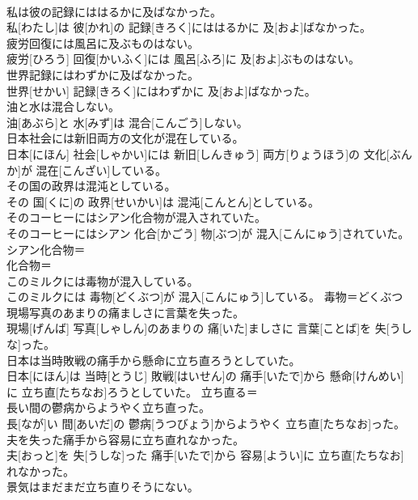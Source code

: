 \documentclass[8pt]{extreport}
\begin{document}
\begin{CJK}{UTF8}{min}
\\	私は彼の記録にははるかに及ばなかった。	
\\	私[わたし]は 彼[かれ]の 記録[きろく]にははるかに 及[およ]ばなかった。	
\\	疲労回復には風呂に及ぶものはない。	
\\	疲労[ひろう] 回復[かいふく]には 風呂[ふろ]に 及[およ]ぶものはない。	
\\	世界記録にはわずかに及ばなかった。	
\\	世界[せかい] 記録[きろく]にはわずかに 及[およ]ばなかった。	
\\	油と水は混合しない。	
\\	油[あぶら]と 水[みず]は 混合[こんごう]しない。	
\\	日本社会には新旧両方の文化が混在している。	
\\	日本[にほん] 社会[しゃかい]には 新旧[しんきゅう] 両方[りょうほう]の 文化[ぶんか]が 混在[こんざい]している。	
\\	その国の政界は混沌としている。	
\\	その 国[くに]の 政界[せいかい]は 混沌[こんとん]としている。	
\\	そのコーヒーにはシアン化合物が混入されていた。	
\\	そのコーヒーにはシアン 化合[かごう] 物[ぶつ]が 混入[こんにゅう]されていた。	シアン化合物＝ 
\\	{化合物＝ 
\\	このミルクには毒物が混入している。	
\\	このミルクには 毒物[どくぶつ]が 混入[こんにゅう]している。	毒物＝どくぶつ
\\	現場写真のあまりの痛ましさに言葉を失った。	
\\	現場[げんば] 写真[しゃしん]のあまりの 痛[いた]ましさに 言葉[ことば]を 失[うしな]った。	
\\	日本は当時敗戦の痛手から懸命に立ち直ろうとしていた。	
\\	日本[にほん]は 当時[とうじ] 敗戦[はいせん]の 痛手[いたで]から 懸命[けんめい]に 立ち直[たちなお]ろうとしていた。	立ち直る＝ 
\\	長い間の鬱病からようやく立ち直った。	
\\	長[なが]い 間[あいだ]の 鬱病[うつびょう]からようやく 立ち直[たちなお]った。	
\\	夫を失った痛手から容易に立ち直れなかった。	
\\	夫[おっと]を 失[うしな]った 痛手[いたで]から 容易[ようい]に 立ち直[たちなお]れなかった。	
\\	景気はまだまだ立ち直りそうにない。	
}
\end{CJK}
\end{document}
